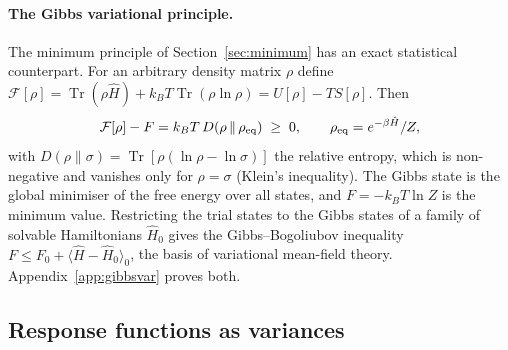 \documentclass[10pt,a4paper]{article}
\theoremstyle{remark}
\newcommand{\Tr}{\operatorname{Tr}}
\begin{document}
\paragraph{The Gibbs variational principle.} The minimum principle of
Section~\ref{sec:minimum} has an exact statistical counterpart. For an
arbitrary density matrix $\rho$ define
$\mathcal{F}[\rho]=\Tr(\rho\hat H)+k_BT\Tr(\rho\ln\rho)=U[\rho]-TS[\rho]$. Then
\[
  \mathcal{F}[\rho]-F=k_BT\,D(\rho\,\|\,\rho_{\rm eq})\;\geq\;0 ,
  \qquad \rho_{\rm eq}=e^{-\beta\hat H}/Z ,
\]
with $D(\rho\|\sigma)=\Tr[\rho(\ln\rho-\ln\sigma)]$ the relative entropy, which
is non-negative and vanishes only for $\rho=\sigma$ (Klein's inequality). The
Gibbs state is the global minimiser of the free energy over all states, and
$F=-k_BT\ln Z$ is the minimum value. Restricting the trial states to the Gibbs
states of a family of solvable Hamiltonians $\hat H_0$ gives the
Gibbs--Bogoliubov inequality $F\leq F_0+\langle\hat H-\hat H_0\rangle_0$, the
basis of variational mean-field theory. Appendix~\ref{app:gibbsvar} proves
both.

\subsection{Response functions as variances}
\label{sec:canonical}
\end{document}
